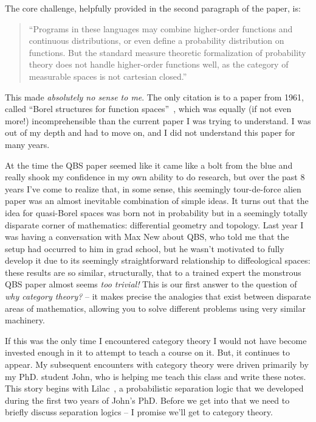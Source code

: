 The core challenge, helpfully provided in the second paragraph 
of the paper, is:

\begin{quotation}
  ``Programs in these languages may combine higher-order functions and
  continuous distributions, or even define a probability distribution on
  functions. But the standard measure theoretic formalization of probability
  theory does not handle
higher-order functions well, as the category of measurable
spaces is not cartesian closed.''~\citep{heunen2017convenient}
\end{quotation}

This made \emph{absolutely no sense to me}. The only citation is to a paper from 1961, called
``Borel structures for function spaces''~\citep{aumann1961borel}, which was
equally (if not even more!) incomprehensible than the current paper I was trying
to understand. I was out of my depth and had to move on, and I did not 
understand this paper for many years.

At the time the QBS paper seemed like it came like a bolt from the blue and
really shook my confidence in my own ability to do research, but over the past 8
years I've come to realize that, in some sense, this seemingly tour-de-force
alien paper was an almost inevitable combination of simple ideas.  It turns out
that the idea for quasi-Borel spaces was born not in probability but in a
seemingly totally disparate corner of mathematics: differential geometry and
topology. Last year I was having a conversation with Max New about QBS, who told me that the setup
had occurred to him in grad school, but he wasn't motivated to fully develop it due to its 
seemingly straightforward relationship to diffeological spaces: 
these results are so similar, structurally, that to a trained expert the monstrous
QBS paper almost seems \emph{too trivial!}
This is our first answer to the question of \emph{why category theory?} -- it makes precise the analogies 
that exist between disparate areas of mathematics, allowing you to solve different 
problems using very similar machinery.

If this was the only time I encountered category theory I would not have
become invested enough in it to attempt to teach a course on it. But, 
it continues to appear. My subsequent encounters with category 
theory were driven primarily by my PhD. student John, who is helping me 
teach this class and write these notes. This story begins with Lilac~\citep{li2023lilac},
a probabilistic separation logic that we developed during the first two 
years of John's PhD. Before we get into that we need to briefly discuss 
separation logics -- I promise we'll get to category theory.

